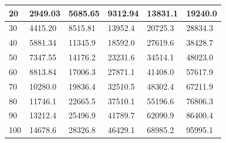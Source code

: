 \begin{table}[htp]
\begin{tabular}{|l|l|l|l|l|l|}
20                                                                         & 2949.03         & 5685.65          & 9312.94          & 13831.1          & 19240.0          \\ \hline
30                                                                         & 4415.20         & 8515.81          & 13952.4          & 20725.3          & 28834.3          \\ \hline
40                                                                         & 5881.34         & 11345.9          & 18592.0          & 27619.6          & 38428.7          \\ \hline
50                                                                         & 7347.55         & 14176.2          & 23231.6          & 34514.1          & 48023.0          \\ \hline
60                                                                         & 8813.84         & 17006.3          & 27871.1          & 41408.0          & 57617.9          \\ \hline
70                                                                         & 10280.0         & 19836.4          & 32510.5          & 48302.4          & 67211.9          \\ \hline
80                                                                         & 11746.1         & 22665.5          & 37510.1          & 55196.6          & 76806.3          \\ \hline
90                                                                         & 13212.4         & 25496.9          & 41789.7          & 62090.9          & 86400.4          \\ \hline
100                                                                        & 14678.6         & 28326.8          & 46429.1          & 68985.2          & 95995.1          \\ \hline
\end{tabular}
\end{table}



